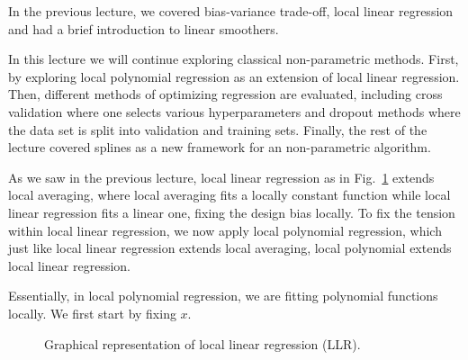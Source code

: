 
\setcounter{section}{0}



	In the previous lecture, we covered bias-variance trade-off, local linear regression and had a brief introduction to linear smoothers. 
	
	In this lecture we will continue exploring classical non-parametric methods. First, by exploring local polynomial regression as an extension of local linear regression. Then, different methods of optimizing regression are evaluated, including cross validation where one selects various hyperparameters and dropout methods where the data set is split into validation and training sets. Finally, the rest of the lecture covered splines as a new framework for an non-parametric algorithm. 
	
As we saw in the previous lecture, local linear regression as in Fig.~\ref{fig:local_linear_regression example} extends local averaging, where local averaging fits a locally constant function while local linear regression fits a linear one, fixing the design bias locally. To fix the tension within local linear regression, we now apply local polynomial regression, which just like local linear regression extends local averaging, local polynomial extends local linear regression.

Essentially, in local polynomial regression, we are fitting polynomial functions locally. We first start by fixing $x$.

\begin{figure}[htbp!]
        \begin{center}
        \caption{Graphical representation of local linear regression (LLR).}
        \label{fig:local_linear_regression example}
        \end{center}
        \end{figure}





